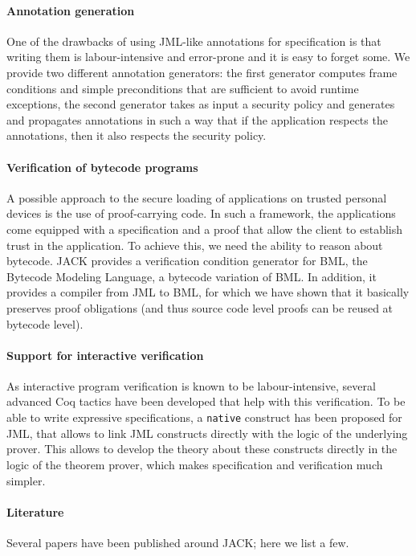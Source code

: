 \documentclass[]{llncs}
\begin{document}
\paragraph{Annotation generation}
One of the drawbacks of using JML-like annotations for specification
is that writing them is labour-intensive and error-prone and it is
easy to forget some. We provide two different annotation generators:
the first generator computes frame conditions and simple preconditions
that are sufficient to avoid runtime exceptions, the second generator
takes as input a security policy and generates and propagates
annotations in such a way that if the application respects the
annotations, then it also respects the security policy.

\paragraph{Verification of bytecode programs}
A possible approach to the secure loading of applications on trusted
personal devices is the use of proof-carrying code. In such a
framework, the applications come equipped with a specification and a
proof that allow the client to establish trust in the application. To
achieve this, we need the ability to reason about bytecode. JACK
provides a verification condition generator for BML, the Bytecode
Modeling Language, a bytecode variation of BML. In addition, it
provides a compiler from JML to BML, for which we have shown that it
basically preserves proof obligations (and thus source code level
proofs can be reused at bytecode level).

\paragraph{Support for interactive verification}
As interactive program verification is known to be labour-intensive,
several advanced Coq tactics have been developed that help with this
verification. To be able to write expressive specifications, a
\texttt{native} construct has been proposed for JML, that allows to
link JML constructs directly with the logic of the underlying
prover. This allows to develop the theory about these constructs
directly in the logic of the theorem prover, which makes specification
and verification much simpler.

\paragraph{Literature}
Several papers have been published around JACK; here we list a few.

\nocite{BRL03:fme,Charles06,m+04:cardis,BurdyP06}



\end{document}
